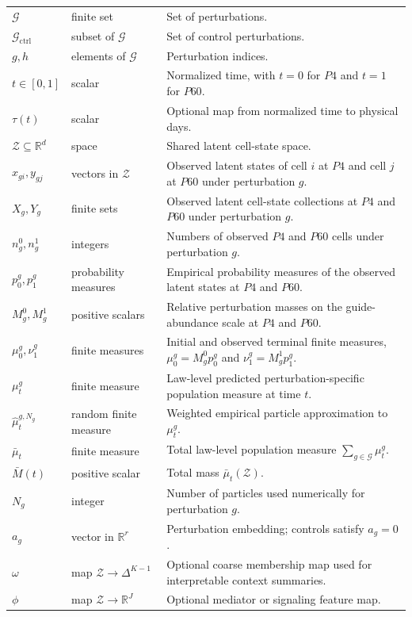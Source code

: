 \documentclass[11pt]{article}
\newcommand{\R}{\mathbb{R}}
\newcommand{\Gcal}{\mathcal{G}}
\newcommand{\Gctrl}{\mathcal{G}_{\mathrm{ctrl}}}
\newcommand{\Zcal}{\mathcal{Z}}
\newcommand{\simplex}{\Delta}
\begin{document}
\begin{longtable}{p{}p{}p{}}
$\Gcal$ & finite set & Set of perturbations.\\
$\Gctrl$ & subset of $\Gcal$ & Set of control perturbations.\\
$g,h$ & elements of $\Gcal$ & Perturbation indices.\\
$t\in[0,1]$ & scalar & Normalized time, with $t=0$ for $P4$ and $t=1$ for $P60$.\\
$\tau(t)$ & scalar & Optional map from normalized time to physical days.\\
$\Zcal\subseteq\R^d$ & space & Shared latent cell-state space.\\
$x_{gi},y_{gj}$ & vectors in $\Zcal$ & Observed latent states of cell $i$ at $P4$ and cell $j$ at $P60$ under perturbation $g$.\\
$X_g,Y_g$ & finite sets & Observed latent cell-state collections at $P4$ and $P60$ under perturbation $g$.\\
$n_g^0,n_g^1$ & integers & Numbers of observed $P4$ and $P60$ cells under perturbation $g$.\\
$p_0^g,p_1^g$ & probability measures & Empirical probability measures of the observed latent states at $P4$ and $P60$.\\
$M_g^0,M_g^1$ & positive scalars & Relative perturbation masses on the guide-abundance scale at $P4$ and $P60$.\\
$\mu_0^g,\nu_1^g$ & finite measures & Initial and observed terminal finite measures, $\mu_0^g=M_g^0p_0^g$ and $\nu_1^g=M_g^1p_1^g$.\\
$\mu_t^g$ & finite measure & Law-level predicted perturbation-specific population measure at time $t$.\\
$\hat\mu_t^{g,N_g}$ & random finite measure & Weighted empirical particle approximation to $\mu_t^g$.\\
$\bar\mu_t$ & finite measure & Total law-level population measure $\sum_{g\in\Gcal}\mu_t^g$.\\
$\bar M(t)$ & positive scalar & Total mass $\bar\mu_t(\Zcal)$.\\
$N_g$ & integer & Number of particles used numerically for perturbation $g$.\\
$a_g$ & vector in $\R^r$ & Perturbation embedding; controls satisfy $a_g=0$.\\
$\omega$ & map $\Zcal\to\simplex^{K-1}$ & Optional coarse membership map used for interpretable context summaries.\\
$\phi$ & map $\Zcal\to\R^J$ & Optional mediator or signaling feature map.\\

\end{longtable}
\end{document}
